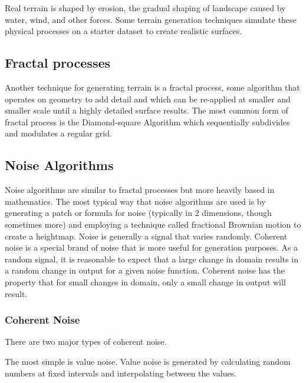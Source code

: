Real terrain is shaped by erosion, the gradual shaping of landscape caused by water, wind, and other forces.
Some terrain generation techniques simulate these physical processes on a starter dataset to create realistic surfaces. \cite{hydrology}

\subsection{Fractal processes}

Another technique for generating terrain is a fractal process, some algorithm that operates on geometry to add detail and which can be re-applied at smaller and smaller scale until a highly detailed surface results.
The most common form of fractal process is the Diamond-square Algorithm which sequentially subdivides and modulates a regular grid.

\subsection{Noise Algorithms}

Noise algorithms are similar to fractal processes but more heavily based in mathematics.
The most typical way that noise algorithms are used is by generating a patch or formula for noise (typically in 2 dimensions, though sometimes more) and employing a technique called fractional Brownian motion to create a heightmap.
Noise is generally a signal that varies randomly.
Coherent noise is a special brand of noise that is more useful for generation purposes.
As a random signal, it is reasonable to expect that a large change in domain results in a random change in output for a given noise function.
Coherent noise has the property that for small changes in domain, only a small change in output will result.

\subsubsection{Coherent Noise}

There are two major types of coherent noise.


The most simple is value noise.
Value noise is generated by calculating random numbers at fixed intervals and interpolating between the values.

